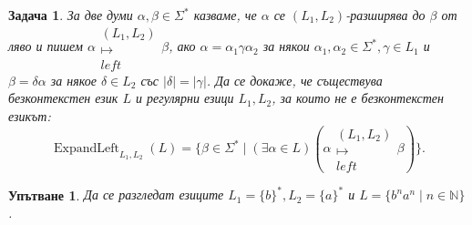 \documentclass[12pt]{article}
\newtheorem{problem}{Задача}[section]
\newtheorem*{hint}{Упътване}
\theoremstyle{definition}
\begin{document}
\begin{problem}
За две думи $\alpha, \beta \in \Sigma^*$ казваме, че $\alpha$ се $(L_1, L_2)$-разширява до $\beta$ от ляво и пишем $\alpha \mathrel{\substack{(L_1, L_2) \\ \longmapsto \\ left}} \beta$, ако $\alpha = \alpha_1 \gamma \alpha_2$ за някои $\alpha_1, \alpha_2 \in \Sigma^*, \gamma \in L_1$ и $\beta = \delta \alpha$ за някое $\delta \in L_2$ със $|\delta| = |\gamma|$.
Да се докаже, че съществува безконтекстен език $L$ и регулярни езици $L_1, L_2$, за които не е безконтекстен езикът:
\[
    \operatorname{ExpandLeft}_{L_1, L_2}(L) = \{ \beta \in \Sigma^* \mid (\exists \alpha \in L)(\alpha \mathrel{\substack{(L_1, L_2) \\ \longmapsto \\ left}} \beta) \}.
\]
\end{problem}

\begin{hint}
    Да се разгледат езиците $L_1 = \{ b \}^*, L_2 = \{ a \}^*$ и $L = \{ b^n a^n \mid n \in \mathbb{N} \}$.
\end{hint}
\end{document}
